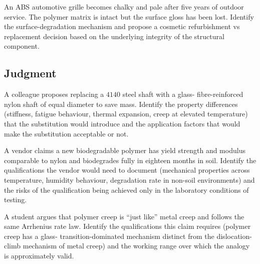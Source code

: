 \begin{exercise}
An ABS automotive grille becomes chalky and pale after five years of
outdoor service. The polymer matrix is intact but the surface gloss
has been lost. Identify the surface-degradation mechanism and
propose a cosmetic refurbishment vs replacement decision based on
the underlying integrity of the structural component.
\end{exercise}

\subsection*{Judgment}

\begin{exercise}
A colleague proposes replacing a $4140$ steel shaft with a glass-
fibre-reinforced nylon shaft of equal diameter to save mass.
Identify the property differences (stiffness, fatigue behaviour,
thermal expansion, creep at elevated temperature) that the
substitution would introduce and the application factors that
would make the substitution acceptable or not.
\end{exercise}

\begin{exercise}
A vendor claims a new biodegradable polymer has yield strength and
modulus comparable to nylon and biodegrades fully in eighteen
months in soil. Identify the qualifications the vendor would need
to document (mechanical properties across temperature, humidity
behaviour, degradation rate in non-soil environments) and the
risks of the qualification being achieved only in the laboratory
conditions of testing.
\end{exercise}

\begin{exercise}
A student argues that polymer creep is ``just like'' metal creep
and follows the same Arrhenius rate law. Identify the
qualifications this claim requires (polymer creep has a glass-
transition-dominated mechanism distinct from the dislocation-climb
mechanism of metal creep) and the working range over which the
analogy is approximately valid.
\end{exercise}
